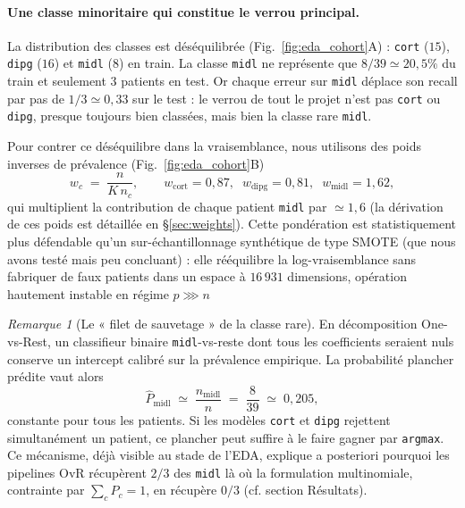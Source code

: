 \documentclass[a4paper,11pt]{paper}
\theoremstyle{plain}
\theoremstyle{definition}
\theoremstyle{remark}
\newtheorem{remark}[theorem]{Remarque}
\begin{document}
\paragraph{Une classe minoritaire qui constitue le verrou principal.}
La distribution des classes est déséquilibrée (Fig.~\ref{fig:eda_cohort}A) : \texttt{cort} ($15$), \texttt{dipg} ($16$) et \texttt{midl} ($8$) en train. La classe \texttt{midl} ne représente que $8/39 \simeq 20{,}5\%$ du train et seulement $3$ patients en test. Or chaque erreur sur \texttt{midl} déplace son recall par pas de $1/3 \simeq 0{,}33$ sur le test : le verrou de tout le projet n'est pas \texttt{cort} ou \texttt{dipg}, presque toujours bien classées, mais bien la classe rare \texttt{midl}.

Pour contrer ce déséquilibre dans la vraisemblance, nous utilisons des poids inverses de prévalence (Fig.~\ref{fig:eda_cohort}B)
$$
    w_c \;=\; \frac{n}{K\, n_c}, \qquad
    w_{\text{cort}} = 0{,}87,\;\; w_{\text{dipg}} = 0{,}81,\;\; w_{\text{midl}} = 1{,}62,
$$
qui multiplient la contribution de chaque patient \texttt{midl} par $\simeq 1{,}6$ (la dérivation de ces poids est détaillée en §\ref{sec:weights}). Cette pondération est statistiquement plus défendable qu'un sur-échantillonnage synthétique de type SMOTE (que nous avons testé mais peu concluant) : elle rééquilibre la log-vraisemblance sans fabriquer de faux patients dans un espace à $16\,931$ dimensions, opération hautement instable en régime $p \ggg n$

\begin{remark}[Le « filet de sauvetage » de la classe rare]
    En décomposition One-vs-Rest, un classifieur binaire \texttt{midl}-vs-reste dont tous les coefficients seraient nuls conserve un intercept calibré sur la prévalence empirique. La probabilité plancher prédite vaut alors
    $$
        \hat P_{\text{midl}} \;\simeq\; \frac{n_{\text{midl}}}{n} \;=\; \frac{8}{39} \;\simeq\; 0{,}205,
    $$
    constante pour tous les patients. Si les modèles \texttt{cort} et \texttt{dipg} rejettent simultanément un patient, ce plancher peut suffire à le faire gagner par \texttt{argmax}. Ce mécanisme, déjà visible au stade de l'EDA, explique a posteriori pourquoi les pipelines OvR récupèrent $2/3$ des \texttt{midl} là où la formulation multinomiale, contrainte par $\sum_c P_c = 1$, en récupère $0/3$ (cf. section Résultats).
\end{remark}
\end{document}
